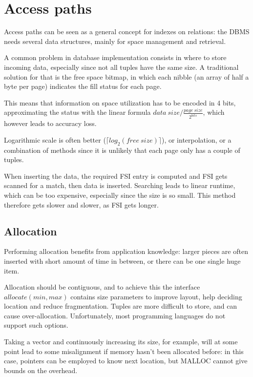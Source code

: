 \section{Access paths}
Access paths can be seen as a general concept for indexes on relations: the DBMS needs several data structures, mainly for space management and retrieval.

A common problem in database implementation consists in where to store incoming data, especially since not all tuples have the same size. A traditional solution for that is the free space bitmap, in which each nibble (an array of half a byte per page) indicates the fill status for each page.

This means that information on space utilization has to be encoded in 4 bits, approximating the status with the linear formula $data\ size / \frac{page\ size}{2^{bits}}$, which however leads to accuracy loss.

Logarithmic scale is often better ($\lceil log_2(free\ size)\rceil$), or interpolation, or a combination of methods since it is unlikely that each page only has a couple of tuples.

When inserting the data, the required FSI entry is computed and FSI gets scanned for a match, then data is inserted. Searching leads to linear runtime, which can be too expensive, especially since the size is so small. This method therefore gets slower and slower, as FSI gets longer. 

\subsection{Allocation}
Performing allocation benefits from application knowledge: larger pieces are often inserted with short amount of time in between, or there can be one single huge item.

Allocation should be contiguous, and to achieve this the interface $allocate(min, max)$ contains size parameters to improve layout, help deciding location and reduce fragmentation. Tuples are more difficult to store, and can cause over-allocation. Unfortunately, most programming languages do not support such options. 

Taking a vector and continuously increasing its size, for example, will at some point lead to some misalignment if memory hasn't been allocated before: in this case, pointers can be employed to know next location, but MALLOC cannot give bounds on the overhead. 